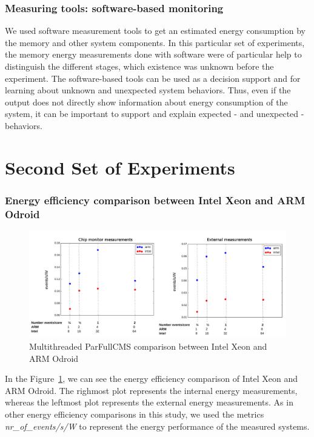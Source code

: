 \subsubsection*{Measuring tools: software-based monitoring}
We used software measurement tools to get an estimated energy consumption by the memory and other system components. In this particular set of experiments, the memory energy measurements done with software were
of particular help to distinguish the different stages, which existence was
unknown before the experiment. The software-based tools can be used as a 
decision support and for learning about unknown and unexpected system behaviors. Thus, even if the output
does not directly show information about energy consumption of the system, it
can be important to support and explain expected - and unexpected - behaviors.
  

\section{Second Set of Experiments}
\subsubsection*{Energy efficiency comparison between Intel Xeon and ARM Odroid}

\begin{figure}[h]
  \centering
    \includegraphics[width=150mm]{"img/acat/results1"}
    \caption{Multithreaded ParFullCMS comparison between Intel Xeon and ARM Odroid}
    \label{fig:parfull_results}
\end{figure}

In the Figure~\ref{fig:parfull_results}, we can see the energy efficiency comparison of Intel Xeon and ARM Odroid. The righmost plot represents the internal energy measurements, whereas the leftmost plot represents the external energy measurements. As in other energy efficiency comparisons in this study, we used the metrics \textit{nr\_of\_events/s/W} to represent the energy performance of the measured systems. 



